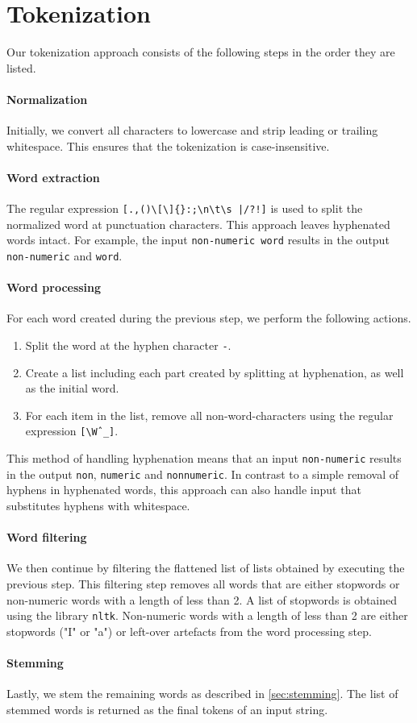 \section{Tokenization}
\label{sec:tokenization}

Our tokenization approach consists of the following steps in the order they are listed.

\paragraph{Normalization}
Initially, we convert all characters to lowercase and strip leading or trailing whitespace.
This ensures that the tokenization is case-insensitive.

\paragraph{Word extraction}
The regular expression \verb=[.,()\[\]{}:;\n\t\s |/?!]= is used to split the normalized word at punctuation characters.
This approach leaves hyphenated words intact.
For example, the input \verb|non-numeric word| results in the output \verb|non-numeric| and \verb|word|.

\paragraph{Word processing}
For each word created during the previous step, we perform the following actions.

\begin{enumerate}
  \item Split the word at the hyphen character \verb|-|.
  \item Create a list including each part created by splitting at hyphenation, as well as the initial word.
  \item For each item in the list, remove all non-word-characters using the regular expression \verb|[\Wˆ_]|.
\end{enumerate}

This method of handling hyphenation means that an input \verb|non-numeric| results in the output \verb|non|, \verb|numeric| and \verb|nonnumeric|.
In contrast to a simple removal of hyphens in hyphenated words, this approach can also handle input that substitutes hyphens with whitespace.

\paragraph{Word filtering}
We then continue by filtering the flattened list of lists obtained by executing the previous step.
This filtering step removes all words that are either stopwords or non-numeric words with a length of less than 2.
A list of stopwords is obtained using the library \verb|nltk|.
Non-numeric words with a length of less than 2 are either stopwords ("I" or "a") or left-over artefacts from the word processing step.

\paragraph{Stemming}
Lastly, we stem the remaining words as described in \cref{sec:stemming}.
The list of stemmed words is returned as the final tokens of an input string.




